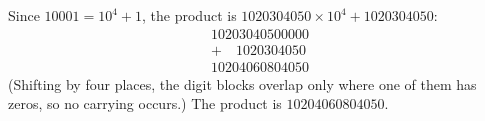 Since $10001=10^4+1$, the product is $1020304050\times10^4+1020304050$:
\[
\begin{array}{r}
10203040500000\\
+\quad1020304050\\\hline
10204060804050
\end{array}
\]
(Shifting by four places, the digit blocks overlap only where one of them has zeros, so no carrying occurs.) The product is $\boxed{10204060804050}$.
